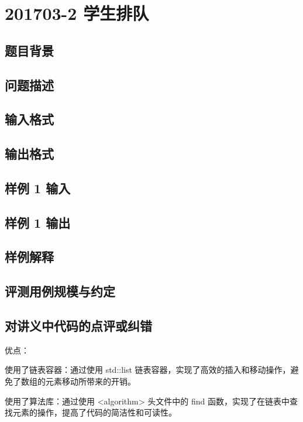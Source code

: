 \section{201703-2 学生排队}

\subsection{题目背景}

\subsection{问题描述}

\subsection{输入格式}

\subsection{输出格式}

\subsection{样例 1 输入}

\subsection{样例 1 输出}

\subsection{样例解释}

\subsection{评测用例规模与约定}

\subsection{对讲义中代码的点评或纠错}
 
优点：

使用了链表容器：通过使用 std::list 链表容器，实现了高效的插入和移动操作，避免了数组的元素移动所带来的开销。

使用了算法库：通过使用 <algorithm> 头文件中的 find 函数，实现了在链表中查找元素的操作，提高了代码的简洁性和可读性。

